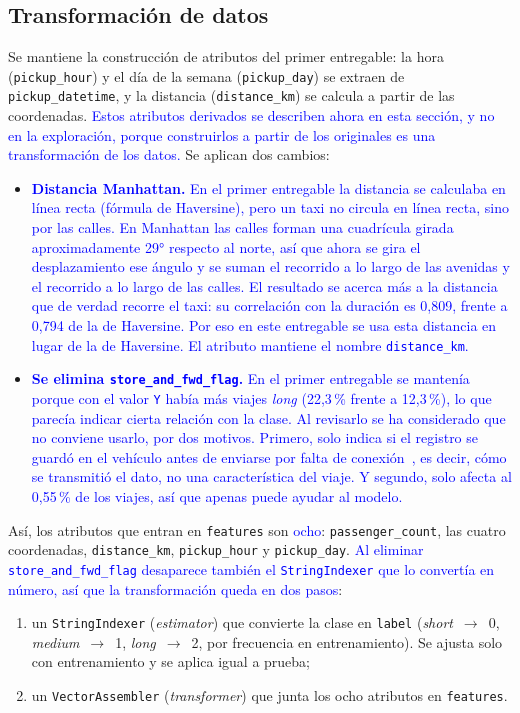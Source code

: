 \documentclass[12pt,a4paper]{article}
\newcommand{\cambio}[1]{\textcolor{blue}{#1}}
\begin{document}
\subsection{Transformación de datos}
\label{sec:transformacion}

Se mantiene la construcción de atributos del primer entregable: la hora (\texttt{pickup\_hour}) y el día de la semana (\texttt{pickup\_day}) se extraen de \texttt{pickup\_datetime}, y la distancia (\texttt{distance\_km}) se calcula a partir de las coordenadas. \cambio{Estos atributos derivados se describen ahora en esta sección, y no en la exploración, porque construirlos a partir de los originales es una transformación de los datos.} Se aplican dos cambios:

\begin{itemize}
    \item \cambio{\textbf{Distancia Manhattan.} En el primer entregable la distancia se calculaba en línea recta (fórmula de Haversine), pero un taxi no circula en línea recta, sino por las calles. En Manhattan las calles forman una cuadrícula girada aproximadamente 29° respecto al norte, así que ahora se gira el desplazamiento ese ángulo y se suman el recorrido a lo largo de las avenidas y el recorrido a lo largo de las calles. El resultado se acerca más a la distancia que de verdad recorre el taxi: su correlación con la duración es 0,809, frente a 0,794 de la de Haversine. Por eso en este entregable se usa esta distancia en lugar de la de Haversine. El atributo mantiene el nombre \texttt{distance\_km}.}
    \item \cambio{\textbf{Se elimina \texttt{store\_and\_fwd\_flag}.} En el primer entregable se mantenía porque con el valor \texttt{Y} había más viajes \textit{long} (22,3\,\% frente a 12,3\,\%), lo que parecía indicar cierta relación con la clase. Al revisarlo se ha considerado que no conviene usarlo, por dos motivos. Primero, solo indica si el registro se guardó en el vehículo antes de enviarse por falta de conexión~\cite{kaggle2017}, es decir, cómo se transmitió el dato, no una característica del viaje. Y segundo, solo afecta al 0,55\,\% de los viajes, así que apenas puede ayudar al modelo.}
\end{itemize}

Así, los atributos que entran en \texttt{features} son \cambio{ocho}: \texttt{passenger\_count}, las cuatro coordenadas, \texttt{distance\_km}, \texttt{pickup\_hour} y \texttt{pickup\_day}. \cambio{Al eliminar \texttt{store\_and\_fwd\_flag} desaparece también el \texttt{StringIndexer} que lo convertía en número, así que la transformación queda en dos pasos}:
\begin{enumerate}
    \item un \texttt{StringIndexer} (\textit{estimator}) que convierte la clase en \texttt{label} (\textit{short}~$\to$~0, \textit{medium}~$\to$~1, \textit{long}~$\to$~2, por frecuencia en entrenamiento). Se ajusta solo con entrenamiento y se aplica igual a prueba;
    \item un \texttt{VectorAssembler} (\textit{transformer}) que junta los ocho atributos en \texttt{features}.
\end{enumerate}
\end{document}
